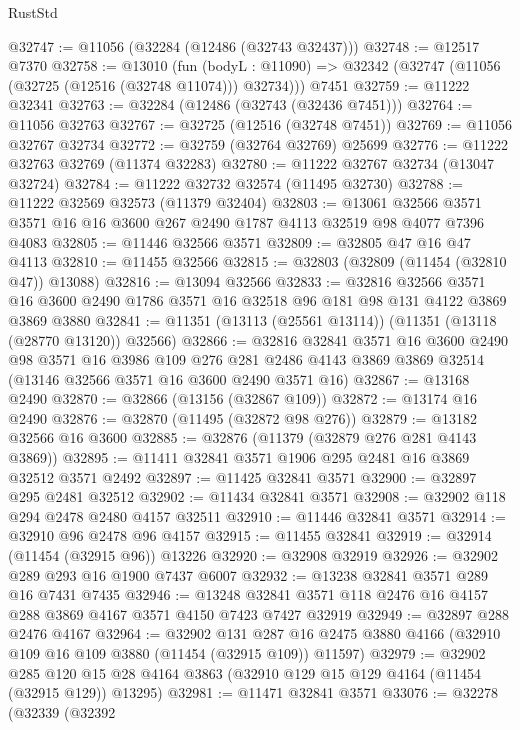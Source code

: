 \begin{lexlean}{RustStd}
\begin{coremodule}
@32747 := @11056 (@32284 (@12486 (@32743 @32437)))
@32748 := @12517 @7370
@32758 := @13010
    (fun (bodyL : @11090) => @32342 (@32747 (@11056 (@32725 (@12516 (@32748 @11074))) @32734)))
    @7451
@32759 := @11222 @32341
@32763 := @32284 (@12486 (@32743 (@32436 @7451)))
@32764 := @11056 @32763
@32767 := @32725 (@12516 (@32748 @7451))
@32769 := @11056 @32767 @32734
@32772 := @32759 (@32764 @32769) @25699
@32776 := @11222 @32763 @32769 (@11374 @32283)
@32780 := @11222 @32767 @32734 (@13047 @32724)
@32784 := @11222 @32732 @32574 (@11495 @32730)
@32788 := @11222 @32569 @32573 (@11379 @32404)
@32803 := @13061
    @32566
    @3571
    @3571
    @16
    @16
    @3600
    @267
    @2490
    @1787
    @4113
    @32519
    @98
    @4077
    @7396
    @4083
@32805 := @11446 @32566 @3571
@32809 := @32805 @47 @16 @47 @4113
@32810 := @11455 @32566
@32815 := @32803 (@32809 (@11454 (@32810 @47)) @13088)
@32816 := @13094 @32566
@32833 := @32816
    @32566
    @3571
    @16
    @3600
    @2490
    @1786
    @3571
    @16
    @32518
    @96
    @181
    @98
    @131
    @4122
    @3869
    @3869
    @3880
@32841 := @11351 (@13113 (@25561 @13114)) (@11351 (@13118 (@28770 @13120)) @32566)
@32866 := @32816
    @32841
    @3571
    @16
    @3600
    @2490
    @98
    @3571
    @16
    @3986
    @109
    @276
    @281
    @2486
    @4143
    @3869
    @3869
    @32514
    (@13146 @32566 @3571 @16 @3600 @2490 @3571 @16)
@32867 := @13168 @2490
@32870 := @32866 (@13156 (@32867 @109))
@32872 := @13174 @16 @2490
@32876 := @32870 (@11495 (@32872 @98 @276))
@32879 := @13182 @32566 @16 @3600
@32885 := @32876 (@11379 (@32879 @276 @281 @4143 @3869))
@32895 := @11411 @32841 @3571 @1906 @295 @2481 @16 @3869 @32512 @3571 @2492
@32897 := @11425 @32841 @3571
@32900 := @32897 @295 @2481 @32512
@32902 := @11434 @32841 @3571
@32908 := @32902 @118 @294 @2478 @2480 @4157 @32511
@32910 := @11446 @32841 @3571
@32914 := @32910 @96 @2478 @96 @4157
@32915 := @11455 @32841
@32919 := @32914 (@11454 (@32915 @96)) @13226
@32920 := @32908 @32919
@32926 := @32902 @289 @293 @16 @1900 @7437 @6007
@32932 := @13238 @32841 @3571 @289 @16 @7431 @7435
@32946 := @13248 @32841 @3571 @118 @2476 @16 @4157 @288 @3869 @4167 @3571 @4150 @7423 @7427 @32919
@32949 := @32897 @288 @2476 @4167
@32964 := @32902
    @131
    @287
    @16
    @2475
    @3880
    @4166
    (@32910 @109 @16 @109 @3880 (@11454 (@32915 @109)) @11597)
@32979 := @32902
    @285
    @120
    @15
    @28
    @4164
    @3863
    (@32910 @129 @15 @129 @4164 (@11454 (@32915 @129)) @13295)
@32981 := @11471 @32841 @3571
@33076 := @32278
    (@32339
      (@32392

\end{coremodule}
\end{lexlean}
